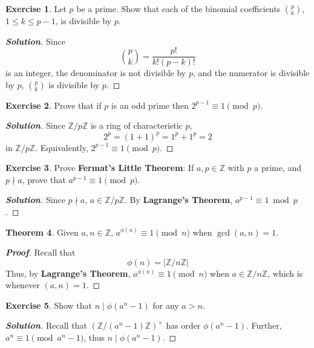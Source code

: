 \documentclass[12pt,leqno]{book}
\numberwithin{equation}{section}
\theoremstyle{definition}
\newtheorem{thm}{Theorem}[section]
\newtheorem{exer}[thm]{Exercise}
\newenvironment{Proof}{\begin{proof}[\textnormal{\textbf{Proof}}]}{\end{proof}}
\newenvironment{Solution}{\begin{proof}[\textnormal{\textbf{Solution}}]}{\end{proof}}
\begin{document}
\begin{exer}
 Let $p$ be a prime. Show that each of the binomial coefficients ${p\choose k}$, $1\leq k\leq p-1$, is divisible by $p$.
\end{exer}

\begin{Solution}
 Since \[{p\choose k}=\frac{p!}{k!(p-k)!}\] is an integer, the denominator is not divisible by $p$, and the numerator is divisible by $p$, ${p\choose k}$ is divisible by $p$.
\end{Solution}

\begin{exer}
 Prove that if $p$ is an odd prime then $2^{p-1}\equiv1\pmod{p}$.
\end{exer}

\begin{Solution}
 Since $\mathbb{Z}/p\mathbb{Z}$ is a ring of characteristic $p$, \[2^p=(1+1)^p=1^p+1^p=2\] in $\mathbb{Z}/p\mathbb{Z}$. Equivalently, $2^{p-1}\equiv1\pmod{p}$.
\end{Solution}

\begin{exer}
 Prove \textbf{Fermat's Little Theorem}: If $a,p\in\mathbb{Z}$ with $p$ a prime, and $p\nmid a$, prove that $a^{p-1}\equiv1\pmod{p}$. 
\end{exer}

\begin{Solution}
 Since $p\nmid a$, $a\in\mathbb{Z}/p\mathbb{Z}$. By \textbf{Lagrange's Theorem}, $a^{p-1}\equiv1\bmod{p}$. 
\end{Solution}

\begin{thm}
 Given $a,n\in\mathbb{Z}$, $a^{\phi(n)}\equiv1\pmod{n}$ when $\gcd(a,n)=1$. 
\end{thm}

\begin{Proof}
 Recall that \[\phi(n)=\left|\mathbb{Z}/n\mathbb{Z}\right|\] Thus, by \textbf{Lagrange's Theorem}, $a^{\phi(n)}\equiv1\pmod{n}$ when $a\in\mathbb{Z}/n\mathbb{Z}$, which is whenever $(a,n)=1$.
\end{Proof}

\begin{exer}
 Show that $n\mid\phi(a^n-1)$ for any $a>n$.
\end{exer}

\begin{Solution}
 Recall that $\left(\mathbb{Z}/(a^n-1)\mathbb{Z}\right)^{\times}$ has order $\phi(a^n-1)$. Further, $a^n\equiv1\pmod{a^n-1}$, thus $n\mid\phi(a^n-1)$.
\end{Solution}
\end{document}
